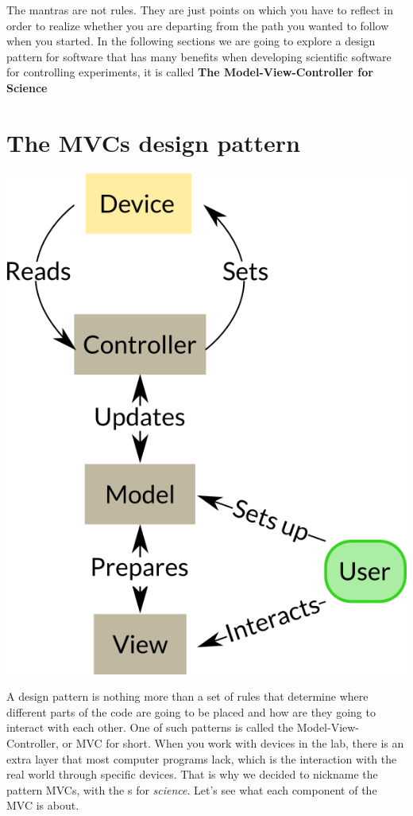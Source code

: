 The mantras are not rules. They are just points on which you have to reflect in order to realize whether you are departing from the path you wanted to follow when you started. In the following sections we are going to explore a design pattern for software that has many benefits when developing scientific software for controlling experiments, it is called \textbf{The Model-View-Controller for Science}

\section{The MVCs design pattern}\label{section:MVC}
\begin{center}
\includegraphics{images/Chapter_04/MVCs.png}
\end{center}

A design pattern is nothing more than a set of rules that determine where different parts of the code are going to be placed and how are they going to interact with each other. One of such patterns is called the Model-View-Controller, or MVC for short. When you work with devices in the lab, there is an extra layer that most computer programs lack, which is the interaction with the real world through specific devices. That is why we decided to nickname the pattern MVCs, with the s for \emph{science}. Let's see what each component of the MVC is about.

